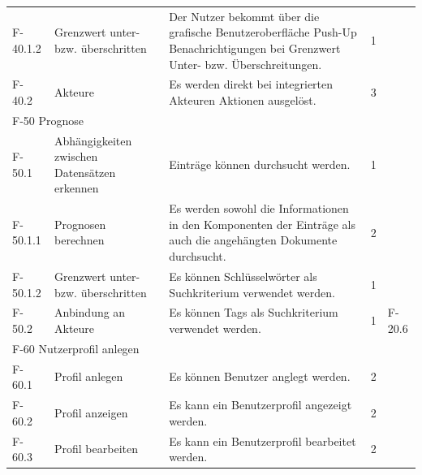 \begin{tabularx}{\textwidth}{|l|X|X|l|l|}
    F-40.1.2 & Grenzwert unter- bzw. überschritten & Der Nutzer bekommt über die grafische Benutzeroberfläche Push-Up Benachrichtigungen bei Grenzwert Unter- bzw. Überschreitungen. & 1 & \\
    F-40.2 & Akteure & Es werden direkt bei integrierten Akteuren Aktionen ausgelöst. & 3 & \\
    \hline
    \multicolumn{5}{|l|}{F-50 Prognose}\\
    \hline
    F-50.1 & Abhängigkeiten zwischen Datensätzen erkennen & Einträge können durchsucht werden. & 1 &\\
    F-50.1.1 & Prognosen berechnen & Es werden sowohl die Informationen in den Komponenten der Einträge als auch die angehängten Dokumente durchsucht. & 2 & \\
    F-50.1.2 & Grenzwert unter- bzw. überschritten & Es können Schlüsselwörter als Suchkriterium verwendet werden. & 1 &\\
    F-50.2 & Anbindung an Akteure & Es können Tags als Suchkriterium verwendet werden. & 1 & F-20.6\\
    \hline
    \multicolumn{5}{|l|}{F-60 Nutzerprofil anlegen}\\
    \hline
    F-60.1 & Profil anlegen & Es können Benutzer anglegt werden. & 2 & \\
    F-60.2 & Profil anzeigen & Es kann ein Benutzerprofil angezeigt werden. & 2 & \\
    F-60.3 & Profil bearbeiten & Es kann ein Benutzerprofil bearbeitet werden. & 2 & \\
    \bottomrule

\end{tabularx}

